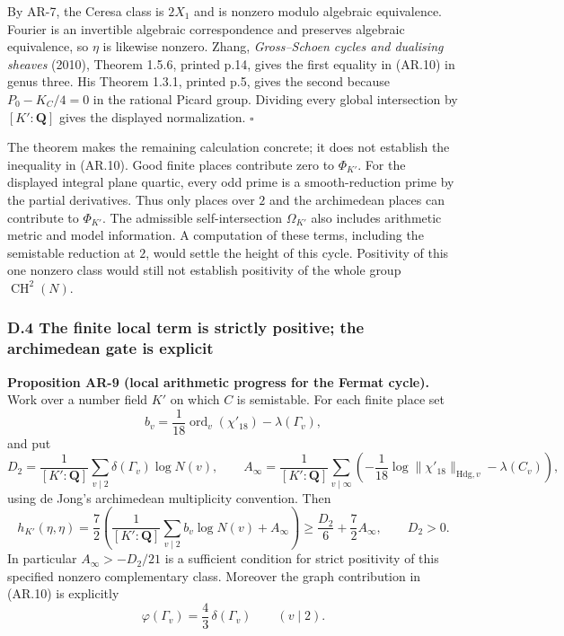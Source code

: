 By AR-7, the Ceresa class is \(2X_1\) and is nonzero modulo algebraic
equivalence. Fourier is an invertible algebraic correspondence and
preserves algebraic equivalence, so \(\eta\) is likewise nonzero. Zhang,
\emph{Gross--Schoen cycles and dualising sheaves} (2010), Theorem 1.5.6,
printed p.14, gives the first equality in (AR.10) in genus three. His
Theorem 1.3.1, printed p.5, gives the second because \(P_0-K_C/4=0\) in
the rational Picard group. Dividing every global intersection by
\([K':\mathbf Q]\) gives the displayed normalization. \(\square\)

The theorem makes the remaining calculation concrete; it does not
establish the inequality in (AR.10). Good finite places contribute zero
to \(\Phi_{K'}\). For the displayed integral plane quartic, every odd
prime is a smooth-reduction prime by the partial derivatives. Thus only
places over \(2\) and the archimedean places can contribute to
\(\Phi_{K'}\). The admissible self-intersection \(\Omega_{K'}\) also
includes arithmetic metric and model information. A computation of these
terms, including the semistable reduction at \(2\), would settle the
height of this cycle. Positivity of this one nonzero class would still
not establish positivity of the whole group \(\operatorname{CH}^2(N)\).

\subsubsection{D.4 The finite local term is strictly positive; the
archimedean gate is
explicit}\label{d.4-the-finite-local-term-is-strictly-positive-the-archimedean-gate-is-explicit}

\textbf{Proposition AR-9 (local arithmetic progress for the Fermat
cycle).} Work over a number field \(K'\) on which \(C\) is semistable.
For each finite place set \[
b_v=\frac1{18}\operatorname{ord}_v(\chi'_{18})-\lambda(\Gamma_v),
\] and put \[
D_2=\frac1{[K':\mathbf Q]}\sum_{v\mid2}\delta(\Gamma_v)\log N(v),\qquad
A_\infty=\frac1{[K':\mathbf Q]}\sum_{v\mid\infty}
\left(-\frac1{18}\log\|\chi'_{18}\|_{\mathrm{Hdg},v}-\lambda(C_v)\right),
\] using de Jong's archimedean multiplicity convention. Then \[
h_{K'}(\eta,\eta)
 =\frac72\left(
  \frac1{[K':\mathbf Q]}\sum_{v\mid2}b_v\log N(v)+A_\infty
 \right)
 \ge\frac{D_2}{6}+\frac72 A_\infty,\qquad D_2>0.
\tag{AR.12}
\] In particular \(A_\infty>-D_2/21\) is a sufficient condition for
strict positivity of this specified nonzero complementary class.
Moreover the graph contribution in (AR.10) is explicitly \[
\varphi(\Gamma_v)=\frac43\,\delta(\Gamma_v)\qquad(v\mid2).
\tag{AR.13}
\]

